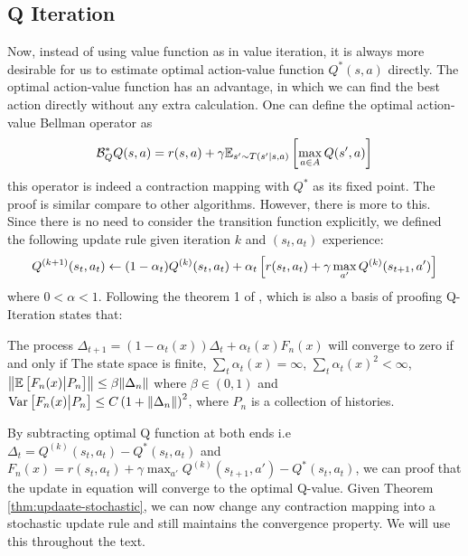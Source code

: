 \subsection{Q Iteration}
\label{sec:chap2-Q-iter}
Now, instead of using value function as in value iteration, it is always more desirable for us to estimate optimal action-value function $Q^*(s, a)$ directly. The optimal action-value function has an advantage, in which we can find the best action directly without any extra calculation. One can define the optimal action-value Bellman operator as 
\begin{equation}
    \mathcal{B}^*_Q Q(s, a) = r(s, a) + \gamma \mathbb{E}_{s' \sim T(s' | s, a)}\left[ \max_{a\in A} Q(s', a) \right] 
\end{equation}
this operator is indeed a contraction mapping with $Q^*$ as its fixed point. The proof is similar compare to other algorithms. However, there is more to this. Since there is no need to consider the transition function explicitly, we defined the following update rule given iteration $k$ and $(s_t, a_t)$ experience:
\begin{equation}
\label{eqn:chap2-Q-stochastic-update}
    Q^{(k+1)}(s_t, a_t) \leftarrow (1-\alpha_t) Q^{(k)}(s_t, a_t) + \alpha_t\left[ r(s_t, a_t) + \gamma \max_{a'} Q^{(k)}(s_{t+1}, a') \right]
\end{equation}
where $0 < \alpha < 1$. Following the theorem 1 of \cite{jaakkola1994convergence}, which is also a basis of proofing Q-Iteration states that:
\begin{theorem}
\label{thm:updaate-stochastic}{\cite{jaakkola1994convergence}}
    The process $\Delta_{t+1} = (1-\alpha_t(x)) \Delta_t + \alpha_t(x) F_n(x) $ will converge to zero if and only if The state space is finite, $\sum_t \alpha_t(x) = \infty$, $\sum_t \alpha_t(x)^2 < \infty$, $\left\|\mathbb{E}\left[ F_n(x) \big| P_n \right] \right\| \le \beta \|\Delta_n\|$ where $\beta \in (0, 1)$ and  $\operatorname{Var}\left[ F_n(x) \big| P_n \right] \le C\left( 1 + \|\Delta_n\| \right)^2$, where $P_n$ is a collection of histories. 
\end{theorem}
By subtracting optimal Q function at both ends i.e $\Delta_t = Q^{(k)}(s_t, a_t) - Q^*(s_t, a_t)$ and $F_n(x) = r(s_t, a_t) + \gamma \max_{a'} Q^{(k)}(s_{t+1}, a') - Q^*(s_t, a_t)$, we can proof that the update in equation \label{eqn:chap2-Q-stochastic-update} will converge to the optimal Q-value. Given Theorem \ref{thm:updaate-stochastic}, we can now change any contraction mapping into a stochastic update rule and still maintains the convergence property. We will use this throughout the text.

